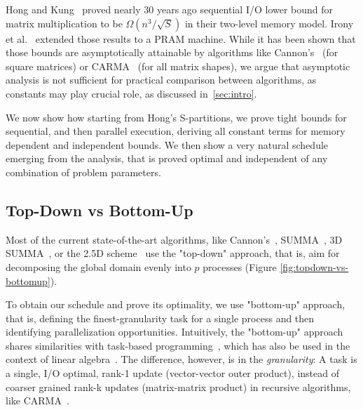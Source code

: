 \documentclass[sigplan,review,anonymous]{acmart}\settopmatter{printfolios=true,printccs=false,printacmref=false}
\begin{document}
Hong and Kung~\cite{redblue} proved nearly 30 years ago sequential I/O lower
bound for matrix multiplication to be $\Omega\left(n^3/\sqrt{S}\right)$ in
their two-level memory model. Irony et al.~\cite{IronyMMM} extended those
results to a PRAM machine. While it
has been shown that those bounds are asymptotically attainable by algorithms
like Cannon's~\cite{Cannon} (for square matrices) or CARMA~\cite{CARMA} (for
all matrix shapes), we argue that asymptotic analysis is not sufficient for
practical comparison between algorithms, as constants may play crucial role, as
discussed in~\cref{sec:intro}.

We now show how starting from Hong's S-partitions, we prove tight bounds for
sequential, and then parallel execution, deriving all constant terms for memory
dependent and independent bounds. We then show a very natural schedule emerging
from the analysis, that is proved optimal and independent of any combination of
problem parameters. 

\subsection{Top-Down vs Bottom-Up}

Most of the current state-of-the-art algorithms, like Cannon's~\cite{Cannon},
SUMMA~\cite{summa}, 3D SUMMA~\cite{summa3d}, or the 2.5D scheme~\cite{25d}
use the "top-down" approach, that is, aim for decomposing the global domain
evenly into $p$ processes (Figure \ref{fig:topdown-vs-bottomup}).

To obtain our schedule and prove its optimality, we use "bottom-up" approach,
that is, defining the finest-granularity task for a single process and then
identifying parallelization opportunities.  Intuitively, the "bottom-up"
approach shares similarities with task-based programming~\cite{taskparalelism},
which has also be used in the context of linear algebra~\cite{taskMMM}. The
difference, however, is in the \emph{granularity}: A task is a single, I/O
optimal, rank-1 update (vector-vector outer product), instead of coarser grained
rank-k updates (matrix-matrix product) in recursive algorithms, like
CARMA~\cite{CARMA}.
%
\end{document}
